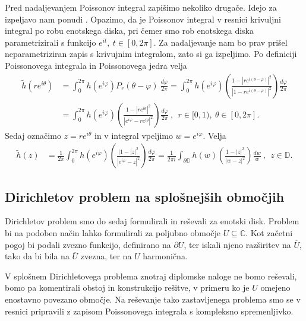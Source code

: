 \documentclass[mat1, tisk]{fmfdelo}
\begin{document}
    Pred nadaljevanjem Poissonov integral zapišimo nekoliko drugače. Idejo za izpeljavo nam ponudi \cite[stran 2]{ustinovskiy}. Opazimo, da je Poissonov integral v resnici krivuljni integral po robu enotskega diska, pri čemer smo rob enotskega diska parametrizirali s funkcijo $e^{it},~t \in [0,2 \pi]$. 
    Za nadaljevanje nam bo prav prišel neparametriziran zapis s krivujnim integralom, zato si ga izpeljimo. Po definiciji Poissonovega integrala in Poissonovega jedra velja
    \begin{align*}
        \widetilde{h}(r e^{i\theta}) &= \int_{0}^{2\pi}{h(e^{i\varphi}) P_r(\theta - \varphi)~\frac{d\varphi}{2 \pi}} = \int_{0}^{2\pi}{h(e^{i\varphi}) \left(\frac{1 - |r e^{i (\theta - \varphi)}|^2}{|1 - r e^{i (\theta - \varphi)}|^2}\right)\frac{d\varphi}{2 \pi}} \\
        & = \int_{0}^{2\pi}{h(e^{i\varphi}) \left(\frac{1 - |r e^{i \theta}|^2}{|e^{i \varphi} - r e^{i \theta}|^2}\right)\frac{d\varphi}{2 \pi}}~,~~ r \in [0,1),~\theta \in [0,2 \pi].
    \end{align*}
    Sedaj označimo $z = re^{i \theta}$ in v integral vpeljimo $w = e^{i \varphi}$. Velja
    \begin{align}
        \label{pi_kompl}
        \widetilde{h}(z) &= \frac{1}{2\pi}\int_{0}^{2\pi}{h(e^{i\varphi}) \left(\frac{|1 - |z|^2}{|e^{i \varphi} - z|^2}\right)\frac{d\varphi}{2 \pi}}= \frac{1}{2\pi i}\int_{\partial \mathbb{D}}{h(w) \left(\frac{1 - |z|^2}{|w - z|^2}\right)\frac{dw}{w}}~,~~ z \in \mathbb{D}.
    \end{align}

\subsection{Dirichletov problem na splošnejših območjih}
    Dirichletov problem smo do sedaj formulirali in reševali za enotski disk. Problem bi na podoben način lahko formulirali za poljubno območje $U \subseteq \mathbb{C}$. 
    Kot začetni pogoj bi podali zvezno funkcijo, definirano na $\partial U$, ter iskali njeno razširitev na $\overline{U}$, tako da bi bila na $\overline{U}$ zvezna, ter na $U$ harmonična.
    
    V splošnem Dirichletovega problema znotraj diplomske naloge ne bomo reševali, bomo pa komentirali obstoj in konstrukcijo rešitve, v primeru ko je $U$ omejeno enostavno povezano območje.
    Na reševanje tako zastavljenega problema smo se v resnici pripravili z zapisom Poissonovega integrala s kompleksno spremenljivko.
\end{document}
